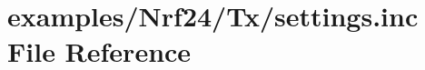 \hypertarget{examples_2Nrf24_2Tx_2settings_8inc}{}\section{examples/\+Nrf24/\+Tx/settings.inc File Reference}
\label{examples_2Nrf24_2Tx_2settings_8inc}
